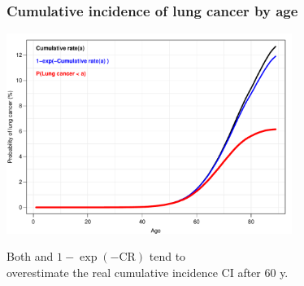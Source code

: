 \documentclass[handout,12pt,dvipsnames,t]{beamer}
\begin{document}
\begin{frame}
\frametitle{Cumulative incidence of lung cancer by age}

\includegraphics[height=6.5cm]{lung-ca-prob}

Both  and $1 - \exp(- \text{CR})$ tend to \\
 overestimate the real cumulative incidence CI after 60 y.
\end{frame}
\end{document}
